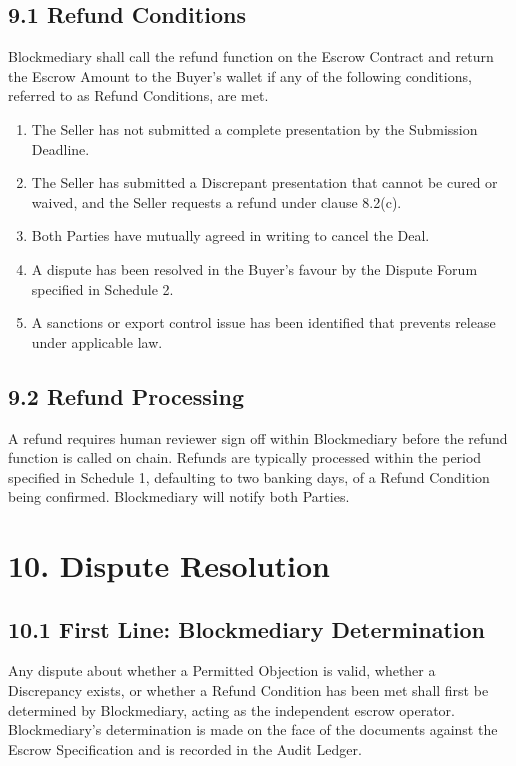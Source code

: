\documentclass[12pt, a4paper]{article}
\begin{document}
\subsection*{9.1 Refund Conditions}

Blockmediary shall call the refund function on the Escrow Contract and return the Escrow
Amount to the Buyer's wallet if any of the following conditions, referred to as Refund
Conditions, are met.

\begin{enumerate}[label=(\alph*)]
\item The Seller has not submitted a complete presentation by the Submission Deadline.
\item The Seller has submitted a Discrepant presentation that cannot be cured or waived,
and the Seller requests a refund under clause 8.2(c).
\item Both Parties have mutually agreed in writing to cancel the Deal.
\item A dispute has been resolved in the Buyer's favour by the Dispute Forum specified in
Schedule 2.
\item A sanctions or export control issue has been identified that prevents release under
applicable law.
\end{enumerate}

\subsection*{9.2 Refund Processing}

A refund requires human reviewer sign off within Blockmediary before the refund function
is called on chain. Refunds are typically processed within the period specified in
Schedule 1, defaulting to two banking days, of a Refund Condition being confirmed.
Blockmediary will notify both Parties.

\section*{10. Dispute Resolution}

\subsection*{10.1 First Line: Blockmediary Determination}

Any dispute about whether a Permitted Objection is valid, whether a Discrepancy exists, or
whether a Refund Condition has been met shall first be determined by Blockmediary, acting
as the independent escrow operator. Blockmediary's determination is made on the face of
the documents against the Escrow Specification and is recorded in the Audit Ledger.
\end{document}
